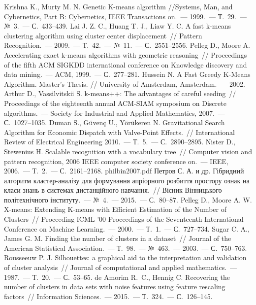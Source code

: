 \begin{thebibliography}{99}
     Krishna K., Murty M. N. Genetic K-means algorithm //Systems, Man, and Cybernetics, Part B: Cybernetics, IEEE Transactions on.~--- 1999.~--- Т.~29.~--- №~3.~--- С.~433--439.
     Lai J. Z. C., Huang T. J., Liaw Y. C. A fast k-means clustering algorithm using cluster center displacement~// Pattern Recognition.~--- 2009.~--- Т.~42.~--- №~11.~--- С.~2551--2556.
     Pelleg D., Moore A. Accelerating exact k-means algorithms with geometric reasoning~// Proceedings of the fifth ACM SIGKDD international conference on Knowledge discovery and data mining.~--- ACM, 1999.~--- С.~277--281.
     Hussein N. A Fast Greedy K-Means Algorithm. Master's Thesis. // University of Amsterdam, Amsterdam.~--- 2002.
     Arthur D., Vassilvitskii S. k-means++: The advantages of careful seeding~// Proceedings of the eighteenth annual ACM-SIAM symposium on Discrete algorithms.~--- Society for Industrial and Applied Mathematics, 2007.~--- С.~1027--1035.
     Duman S., G\"{u}ven\c{c} U., Y\"{o}r\"{u}keren N. Gravitational Search Algorithm for Economic Dispatch with Valve-Point Effects.~// International Review of Electrical Engineering 2010.~--- Т.~5.~--- С.~2890--2895.
     Nister D., Stewenius H. Scalable recognition with a vocabulary tree~// Computer vision and pattern recognition, 2006 IEEE computer society conference on.~--- IEEE, 2006.~--- Т.~2.~--- С.~2161--2168.
     philbin2007.pdf
     Петров С. А. и др. Гібридний алгоритм кластер-аналізу для формування апріорного розбиття простору ознак на класи знань в системах дистанційного навчання.~// Вісник Вінницького політехнічного інституту.~--- №~4.~--- 2015.~--- С.~80--87.
     Pelleg D., Moore A. W. X-means: Extending K-means with Efficient Estimation of the Number of Clusters~// Proceeding ICML '00 Proceedings of the Seventeenth International Conference on Machine Learning.~--- 2000.~--- Т.~1.~--- С.~727--734.
     Sugar C. A., James G. M. Finding the number of clusters in a dataset~// Journal of the American Statistical Association.~--- Т.~98.~--- №~463.~--- 2003.~--- С.~750--763.
     Rousseeuw P. J. Silhouettes: a graphical aid to the interpretation and validation of cluster analysis~// Journal of computational and applied mathematics.~--- 1987.~--- Т.~20.~--- С.~53--65.
     de Amorim R.~C., Hennig C. Recovering the number of clusters in data sets with noise features using feature rescaling factors~// Information Sciences.~--- 2015.~--- Т.~324.~--- С.~126--145.

\end{thebibliography}
